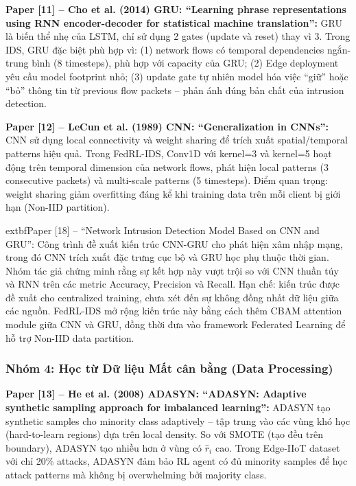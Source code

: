 \documentclass[12pt,a4paper]{article}
\begin{document}
\textbf{Paper [11] -- Cho et al. (2014) GRU: ``Learning phrase representations using RNN encoder-decoder for statistical machine translation'': } GRU là biến thể nhẹ của LSTM, chỉ sử dụng 2 gates (update và reset) thay vì 3. Trong IDS, GRU đặc biệt phù hợp vì: (1) network flows có temporal dependencies ngắn-trung bình (8 timesteps), phù hợp với capacity của GRU; (2) Edge deployment yêu cầu model footprint nhỏ; (3) update gate tự nhiên model hóa việc ``giữ'' hoặc ``bỏ'' thông tin từ previous flow packets -- phản ánh đúng bản chất của intrusion detection.

\textbf{Paper [12] -- LeCun et al. (1989) CNN: ``Generalization in CNNs'': } CNN sử dụng local connectivity và weight sharing để trích xuất spatial/temporal patterns hiệu quả. Trong FedRL-IDS, Conv1D với kernel=3 và kernel=5 hoạt động trên temporal dimension của network flows, phát hiện local patterns (3 consecutive packets) và multi-scale patterns (5 timesteps). Điểm quan trọng: weight sharing giảm overfitting đáng kể khi training data trên mỗi client bị giới hạn (Non-IID partition).


	extbf{Paper [18] -- ``Network Intrusion Detection Model Based on CNN and GRU'': } Công trình đề xuất kiến trúc CNN-GRU cho phát hiện xâm nhập mạng, trong đó CNN trích xuất đặc trưng cục bộ và GRU học phụ thuộc thời gian. Nhóm tác giả chứng minh rằng sự kết hợp này vượt trội so với CNN thuần túy và RNN trên các metric Accuracy, Precision và Recall. Hạn chế: kiến trúc được đề xuất cho centralized training, chưa xét đến sự không đồng nhất dữ liệu giữa các nguồn. FedRL-IDS mở rộng kiến trúc này bằng cách thêm CBAM attention module giữa CNN và GRU, đồng thời đưa vào framework Federated Learning để hỗ trợ Non-IID data partition.
\subsubsection{Nhóm 4: Học từ Dữ liệu Mất cân bằng (Data Processing)}

\textbf{Paper [13] -- He et al. (2008) ADASYN: ``ADASYN: Adaptive synthetic sampling approach for imbalanced learning'': } ADASYN tạo synthetic samples cho minority class adaptively -- tập trung vào các vùng khó học (hard-to-learn regions) dựa trên local density. So với SMOTE (tạo đều trên boundary), ADASYN tạo nhiều hơn ở vùng có $\hat{r}_i$ cao. Trong Edge-IIoT dataset với chỉ 20\% attacks, ADASYN đảm bảo RL agent có đủ minority samples để học attack patterns mà không bị overwhelming bởi majority class.
\end{document}
